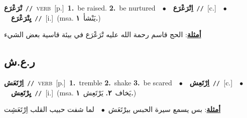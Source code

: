 \documentclass[10pt,a4paper,twoside]{article} %
\begin{document}
\begin{multicols}{2}
{\setlength\topsep{0pt}\textbf{\foreignlanguage{arabic}{تْرَعْرَع}}\ {\color{gray}\texttt{//}\color{black}}\ \textsc{verb}\ [p.]\ \textbf{1.}~be raised.  \textbf{2.}~be nurtured\ \ $\bullet$\ \ \setlength\topsep{0pt}\textbf{\foreignlanguage{arabic}{اِتْرَعْرَع}}\ {\color{gray}\texttt{//}\color{black}}\ [c.]\ \ $\bullet$\ \ \setlength\topsep{0pt}\textbf{\foreignlanguage{arabic}{يِتْرَعْرَع}}\ {\color{gray}\texttt{//}\color{black}}\ [i.]\ \color{gray}(msa. \foreignlanguage{arabic}{يَنْشأ}~\foreignlanguage{arabic}{\textbf{١.}})\color{black}\  \begin{flushright}\color{gray}\foreignlanguage{arabic}{\textbf{\underline{\foreignlanguage{arabic}{أمثلة}}}: الحج قاسم رحمة الله عليه تْرَعْرَع في بيئة قاسية بعض الشيء}\end{flushright}\color{black}} \vspace{2mm}

\vspace{-3mm}
\subsection*{\color{blue}\foreignlanguage{arabic}{ر.ع.ش}\color{blue}{}} 

{\setlength\topsep{0pt}\textbf{\foreignlanguage{arabic}{اِرْتَعَش}}\ {\color{gray}\texttt{//}\color{black}}\ \textsc{verb}\ [p.]\ \textbf{1.}~tremble  \textbf{2.}~shake  \textbf{3.}~be scared\ \ $\bullet$\ \ \setlength\topsep{0pt}\textbf{\foreignlanguage{arabic}{اِرْتَعِش}}\ {\color{gray}\texttt{//}\color{black}}\ [c.]\ \ $\bullet$\ \ \setlength\topsep{0pt}\textbf{\foreignlanguage{arabic}{يِرْتَعِش}}\ {\color{gray}\texttt{//}\color{black}}\ [i.]\ \color{gray}(msa. \foreignlanguage{arabic}{يَخاف}~\foreignlanguage{arabic}{\textbf{٢.}}  \foreignlanguage{arabic}{يَرْتَعِش}~\foreignlanguage{arabic}{\textbf{١.}})\color{black}\  \begin{flushright}\color{gray}\foreignlanguage{arabic}{\textbf{\underline{\foreignlanguage{arabic}{أمثلة}}}: بس يسمع سيرة الحبس بيرْتَعَش\ $\bullet$\ \  لما شفت حبيب القلب اِرْتَعَشِت}\end{flushright}\color{black}} \vspace{2mm}


\end{multicols}
\end{document}
